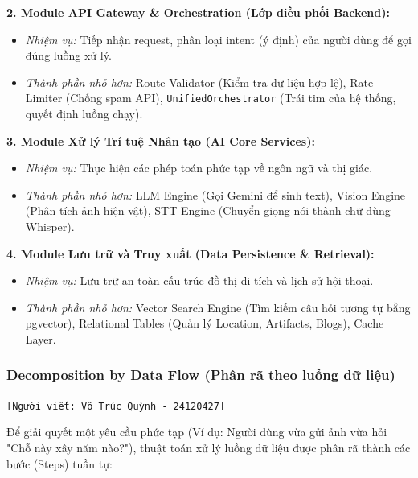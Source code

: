 \textbf{2. Module API Gateway \& Orchestration (Lớp điều phối Backend):}
\begin{itemize}
    \item \textit{Nhiệm vụ:} Tiếp nhận request, phân loại intent (ý định) của người dùng để gọi đúng luồng xử lý.
    \item \textit{Thành phần nhỏ hơn:} Route Validator (Kiểm tra dữ liệu hợp lệ), Rate Limiter (Chống spam API), \texttt{UnifiedOrchestrator} (Trái tim của hệ thống, quyết định luồng chạy).
\end{itemize}

\textbf{3. Module Xử lý Trí tuệ Nhân tạo (AI Core Services):}
\begin{itemize}
    \item \textit{Nhiệm vụ:} Thực hiện các phép toán phức tạp về ngôn ngữ và thị giác.
    \item \textit{Thành phần nhỏ hơn:} LLM Engine (Gọi Gemini để sinh text), Vision Engine (Phân tích ảnh hiện vật), STT Engine (Chuyển giọng nói thành chữ dùng Whisper).
\end{itemize}

\textbf{4. Module Lưu trữ và Truy xuất (Data Persistence \& Retrieval):}
\begin{itemize}
    \item \textit{Nhiệm vụ:} Lưu trữ an toàn cấu trúc đồ thị di tích và lịch sử hội thoại.
    \item \textit{Thành phần nhỏ hơn:} Vector Search Engine (Tìm kiếm câu hỏi tương tự bằng pgvector), Relational Tables (Quản lý Location, Artifacts, Blogs), Cache Layer.
\end{itemize}

\subsubsection{Decomposition by Data Flow (Phân rã theo luồng dữ liệu)}
\texttt{[Người viết: Võ Trúc Quỳnh - 24120427]}

Để giải quyết một yêu cầu phức tạp (Ví dụ: Người dùng vừa gửi ảnh vừa hỏi "Chỗ này xây năm nào?"), thuật toán xử lý luồng dữ liệu được phân rã thành các bước (Steps) tuần tự:

